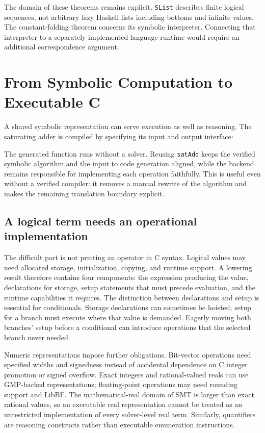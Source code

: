 \documentclass[acmsmall,screen,nonacm]{acmart}
\newcommand{\code}[1]{\texttt{#1}}
\newcommand{\paperlisting}[1]{\par\noindent
  \begin{minipage}{\linewidth}
  
  \end{minipage}\par}
\begin{document}
The domain of these theorems remains explicit. \code{SList} describes finite
logical sequences, not arbitrary lazy Haskell lists including bottoms and
infinite values. The constant-folding theorem concerns its symbolic interpreter.
Connecting that interpreter to a separately implemented language runtime would
require an additional correspondence argument.

\section{From Symbolic Computation to Executable C}
\label{sec:codegen}

A shared symbolic representation can serve execution as well as reasoning.
The saturating adder is compiled by specifying its input and output interface:
\paperlisting{codegen}
The generated function runs without a solver. Reusing \code{satAdd} keeps the
verified symbolic algorithm and the input to code generation aligned, while
the backend remains responsible for implementing each operation faithfully.
This is useful even without a verified compiler: it removes a manual rewrite
of the algorithm and makes the remaining translation boundary explicit.

\subsection{A logical term needs an operational implementation}

The difficult part is not printing an operator in C syntax. Logical values may
need allocated storage, initialization, copying, and runtime support. A lowering
result therefore contains four components: the expression producing the value,
declarations for storage, setup statements that must precede evaluation, and
the runtime capabilities it requires. The distinction between declarations and
setup is essential for conditionals. Storage declarations can sometimes be
hoisted; setup for a branch must execute where that value is demanded. Eagerly
moving both branches' setup before a conditional can introduce operations that
the selected branch never needed.

Numeric representations impose further obligations. Bit-vector operations need
specified widths and signedness instead of accidental dependence on C integer
promotion or signed overflow. Exact integers and rational-valued reals can use
GMP-backed representations; floating-point operations may need rounding support
and LibBF. The mathematical-real domain of SMT is larger than exact rational
values, so an executable real representation cannot be treated as an unrestricted
implementation of every solver-level real term. Similarly, quantifiers are
reasoning constructs rather than executable enumeration instructions.
\end{document}
